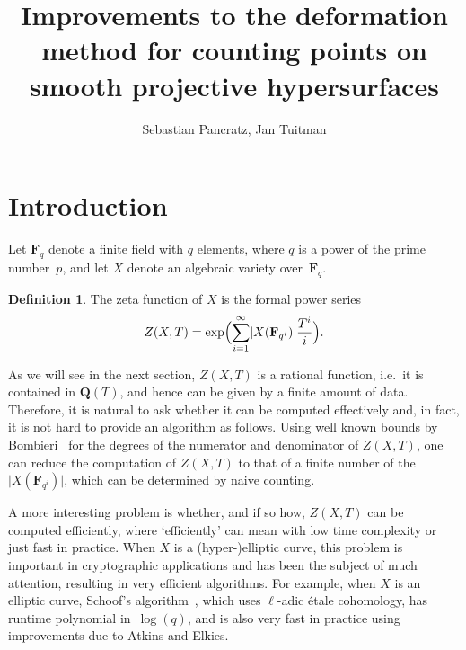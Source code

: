 \documentclass[a4paper,11pt]{article}
\author{Sebastian Pancratz, Jan Tuitman}
\title{Improvements to the deformation method for counting points 
on smooth projective hypersurfaces}
\numberwithin{equation}{section}
\providecommand{\card}[1]{\lvert#1\rvert}                %
\newcommand{\QQ}{\mathbf{Q}} %
\newcommand{\FF}{\mathbf{F}} %
\theoremstyle{definition}
\newtheorem{defn}[thm]{Definition}
\begin{document}
\maketitle


\setcounter{tocdepth}{2}
\tableofcontents


\section{Introduction}
\label{sec:Introduction}

Let $\FF_q$ denote a finite field with $q$ elements, where $q$ is a power of 
the prime number~$p$, and let $X$ denote an algebraic variety over~$\FF_q$. 

\begin{defn}
The zeta function of $X$ is the formal power series
\[
Z(X,T) = \exp \Bigl(\sum_{i=1}^{\infty} \card{X(\FF_{q^i})} \frac{T^i}{i} \Bigr).
\]
\end{defn}

As we will see in the next section, $Z(X,T)$ 
is a rational function, i.e.\ it is contained in $\QQ(T)$, and 
hence can be given by a finite amount of data. Therefore, it is natural 
to ask whether it can be computed effectively and, in fact, it is not 
hard to provide an algorithm as follows. Using well known bounds 
by Bombieri~\citep{Bombieri1966} for the degrees of the numerator and 
denominator of $Z(X,T)$, one can reduce the computation of $Z(X,T)$ to that 
of a finite number of the $\card{X(\FF_{q^i})}$, which can be determined 
by naive counting.

A more interesting problem is whether, and if so how, $Z(X,T)$ can be 
computed efficiently, where `efficiently' can mean with low time complexity 
or just fast in practice. When $X$ is a (hyper-)elliptic curve, this problem
is important in cryptographic applications and has been the subject of 
much attention, resulting in very efficient algorithms.  For example, when 
$X$ is an elliptic curve, Schoof's algorithm~\citep{Schoof1995}, which uses 
$\ell$-adic \'etale cohomology, has runtime polynomial in~$\log(q)$, and is 
also very fast in practice using improvements due to Atkins and Elkies.
\end{document}
